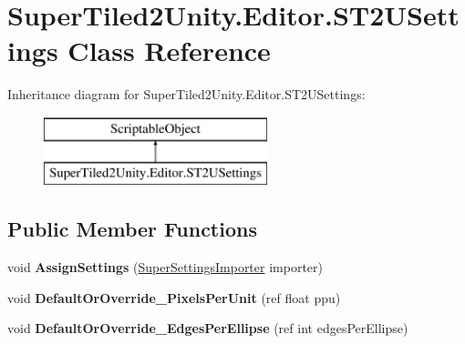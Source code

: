 \hypertarget{class_super_tiled2_unity_1_1_editor_1_1_s_t2_u_settings}{}\section{Super\+Tiled2\+Unity.\+Editor.\+S\+T2\+U\+Settings Class Reference}
\label{class_super_tiled2_unity_1_1_editor_1_1_s_t2_u_settings}
Inheritance diagram for Super\+Tiled2\+Unity.\+Editor.\+S\+T2\+U\+Settings\+:\begin{figure}[H]
\begin{center}
\leavevmode
\includegraphics[height=2.000000cm]{class_super_tiled2_unity_1_1_editor_1_1_s_t2_u_settings}
\end{center}
\end{figure}
\subsection*{Public Member Functions}
\begin{DoxyCompactItemize}
\item 
\mbox{\label{class_super_tiled2_unity_1_1_editor_1_1_s_t2_u_settings_a924681cbd139450f913ffee759688cf0}} 
void {\bfseries Assign\+Settings} (\mbox{\hyperlink{class_super_tiled2_unity_1_1_editor_1_1_super_settings_importer}{Super\+Settings\+Importer}} importer)
\item 
\mbox{\label{class_super_tiled2_unity_1_1_editor_1_1_s_t2_u_settings_a021e5a48eedefd90a300b0b176cc7500}} 
void {\bfseries Default\+Or\+Override\+\_\+\+Pixels\+Per\+Unit} (ref float ppu)
\item 
\mbox{\label{class_super_tiled2_unity_1_1_editor_1_1_s_t2_u_settings_a9f76d2674317dbaa50b8b22ad00d21b7}} 
void {\bfseries Default\+Or\+Override\+\_\+\+Edges\+Per\+Ellipse} (ref int edges\+Per\+Ellipse)
\end{DoxyCompactItemize}
